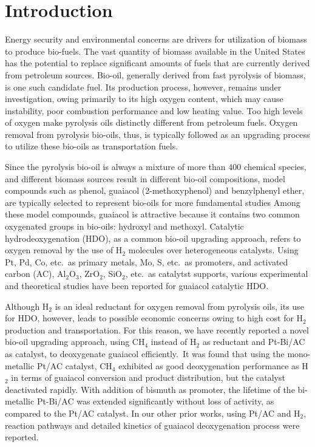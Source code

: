 \documentclass[journal=iecred,manuscript=article]{achemso}
\begin{document}
\newpage
\section{Introduction}
Energy security and environmental concerns are drivers for utilization of biomass to produce bio-fuels.
The vast quantity of biomass available in the United States has the potential
 to replace significant amounts of fuels that are currently derived from petroleum sources.
Bio-oil, generally derived from fast pyrolysis of biomass,
is one such candidate fuel. \cite{Tuck2012}
Its production process, however, remains under investigation,
owing primarily to its high oxygen content, 
which may cause instability, poor combustion performance and low heating value. \cite{Nigam2011,Elliott2009,Mortensen2011}
Too high levels of oxygen make pyrolysis oils distinctly different from petroleum fuels.
Oxygen removal from pyrolysis bio-oils, thus, is typically followed as an upgrading process to utilize
these bio-oils as transportation fuels.\cite{Xiu2012, Elliott2015}

Since the pyrolysis bio-oil is always a mixture of more than 400 chemical species,
and different biomass sources result in different bio-oil compositions, model compounds such as phenol, guaiacol (2-methoxyphenol) and benzylphenyl ether\cite{Guvenatam2014},
are typically selected to represent bio-oils for more fundamental studies\cite{Bridgwater2012}
Among these model compounds, guaiacol is attractive because it contains two common oxygenated groups in bio-oils: hydroxyl and methoxyl.
Catalytic hydrodeoxygenation (HDO), as a common bio-oil upgrading approach,
refers to oxygen removal by the use of H$_{2}$ molecules over heterogeneous catalysts.
Using Pt, Pd, Co, etc.\ as primary metals, 
\cite{Wildschut2009} Mo, S, etc.\ as promoters\cite{Wangt2011}, 
and activated carbon (AC), Al$_{2}$O$_{3}$, ZrO$_{2}$, SiO$_{2}$, etc.\ as catalytst supports,\cite{Gutierrez2009,Saidi2014,Wu2013}
various experimental and theoretical studies have been reported for guaiacol catalytic HDO.\cite{Zhao2011, Bui2011, Zhang2013, Mochizuki2014, Olcese2012, Badawi2011, Lee2015}

Although H$_{2}$ is an ideal reductant for oxygen removal from pyrolysis oils,
its use for HDO, however, leads to possible economic concerns owing to high cost for H$_{2}$ production and transportation.
For this reason, we have recently reported a novel bio-oil upgrading approach\cite{Xiao2015},
using CH$_{4}$ instead of  H$_{2}$ as reductant and Pt-Bi/AC as catalyst, to deoxygenate guaiacol efficiently.\
It was found that using the mono-metallic Pt/AC catalyst,
CH$_{4}$ exhibited as good deoxygenation performance as H$_{2}$ in terms of guaiacol conversion and product distribution,
but the catalyst deactivated rapidly.
With addition of bismuth as promoter,
the lifetime of the bi-metallic Pt-Bi/AC was extended significantly without loss of activity,
as compared to the Pt/AC catalyst.
In our other prior works\cite{Gao2014, Gao2015}, using Pt/AC and H$_{2}$, reaction pathways and detailed kinetics of guaiacol deoxygenation process were reported.
\end{document}
